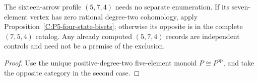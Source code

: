 \begin{corollary}\label{C:sixteen-P5-opposite-seven}
The sixteen-arrow profile $(5,7,4)$ needs no separate
enumeration.  If its seven-element vertex has zero
rational degree-two cohomology, apply
Proposition~\ref{C:P5-four-state-bisets}; otherwise its
opposite is in the complete $(7,5,4)$ catalog.
Any already computed $(5,7,4)$ records are independent
controls and need not be a premise of the exclusion.
\end{corollary}
\begin{proof}
Use the unique positive-degree-two five-element monoid
$P\cong P^{\mathrm{op}}$, and take the opposite category
in the second case.
\end{proof}
